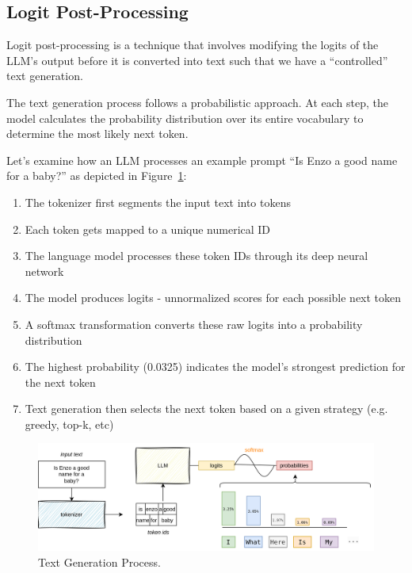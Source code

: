 \subsection{Logit Post-Processing}

Logit post-processing is a technique that involves modifying the logits of the LLM's output before it is converted into text such that we have a ``controlled'' text generation.

The text generation process follows a probabilistic approach. At each step, the model calculates the probability distribution over its entire vocabulary to determine the most likely next token. 

Let's examine how an LLM processes an example prompt ``Is Enzo a good name for a baby?'' as depicted in Figure~\ref{fig:logit}:

\begin{enumerate}
    \item The tokenizer first segments the input text into tokens
    \item Each token gets mapped to a unique numerical ID
    \item The language model processes these token IDs through its deep neural network
    \item The model produces logits - unnormalized scores for each possible next token
    \item A softmax transformation converts these raw logits into a probability distribution
    \item The highest probability (0.0325) indicates the model's strongest prediction for the next token
    \item Text generation then selects the next token based on a given strategy (e.g. greedy, top-k, etc)
\end{enumerate}

\begin{figure}[h]
    \centering
    \includegraphics[width=\textwidth]{../_static/structured_output/logit.svg}
    \caption{Text Generation Process.}
    \label{fig:logit}
\end{figure}

